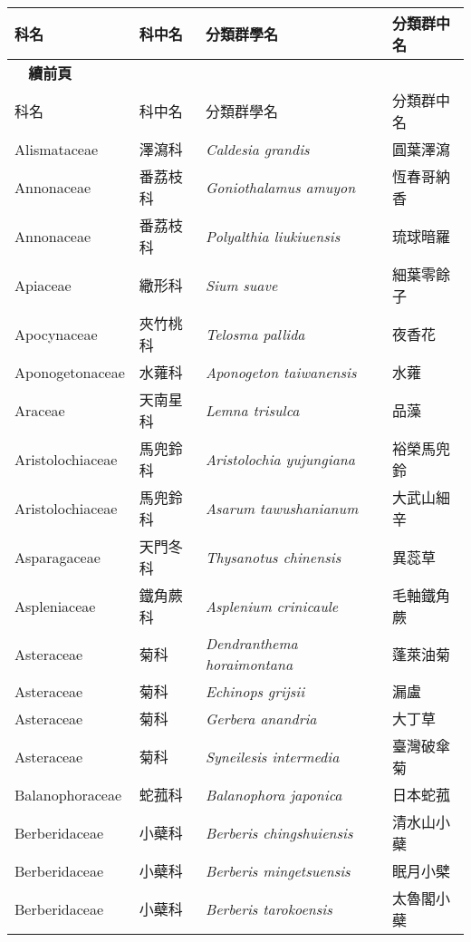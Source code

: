     \begin{longtable}{p{3cm}p{2cm}p{5cm}p{3cm}}
    \toprule
      科名 & 科中名 & 分類群學名 & 分類群中名  \\
    \midrule 
    \endfirsthead
    
    {{\bfseries \tablename\ \thetable{} 續前頁 }} \\
    科名 & 科中名 & 分類群學名 & 分類群中名  \\
    \midrule
    \endhead
            Alismataceae & 澤瀉科 & \textit{Caldesia grandis}  & 圓葉澤瀉\\
    Annonaceae & 番荔枝科 & \textit{Goniothalamus amuyon}  & 恆春哥納香\\
    Annonaceae & 番荔枝科 & \textit{Polyalthia liukiuensis}  & 琉球暗羅\\
    Apiaceae & 繖形科 & \textit{Sium suave}  & 細葉零餘子\\
    Apocynaceae & 夾竹桃科 & \textit{Telosma pallida}  & 夜香花\\
    Aponogetonaceae & 水蕹科 & \textit{Aponogeton taiwanensis}  & 水蕹\\
    Araceae & 天南星科 & \textit{Lemna trisulca}  & 品藻\\
    Aristolochiaceae & 馬兜鈴科 & \textit{Aristolochia yujungiana}  & 裕榮馬兜鈴\\
    Aristolochiaceae & 馬兜鈴科 & \textit{Asarum tawushanianum}  & 大武山細辛\\
    Asparagaceae & 天門冬科 & \textit{Thysanotus chinensis}  & 異蕊草\\
    Aspleniaceae & 鐵角蕨科 & \textit{Asplenium crinicaule}  & 毛軸鐵角蕨\\
    Asteraceae & 菊科 & \textit{Dendranthema horaimontana}  & 蓬萊油菊\\
    Asteraceae & 菊科 & \textit{Echinops grijsii}  & 漏盧\\
    Asteraceae & 菊科 & \textit{Gerbera anandria}  & 大丁草\\
    Asteraceae & 菊科 & \textit{Syneilesis intermedia}  & 臺灣破傘菊\\
    Balanophoraceae & 蛇菰科 & \textit{Balanophora japonica}  & 日本蛇菰\\
    Berberidaceae & 小蘗科 & \textit{Berberis chingshuiensis}  & 清水山小蘗\\
    Berberidaceae & 小蘗科 & \textit{Berberis mingetsuensis}  & 眠月小檗\\
    Berberidaceae & 小蘗科 & \textit{Berberis tarokoensis}  & 太魯閣小蘗\\

\end{longtable}
